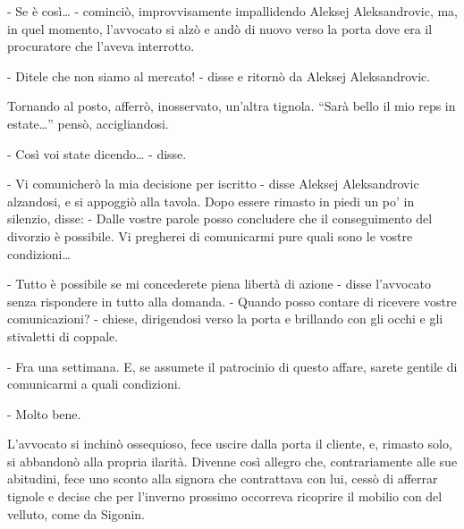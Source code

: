 - Se è così\ldots{} - cominciò, improvvisamente impallidendo Aleksej Aleksandrovic, ma, in quel momento, l'avvocato si alzò e andò di nuovo verso la porta dove era il procuratore che l'aveva interrotto. 

- Ditele che non siamo al mercato! - disse e ritornò da Aleksej Aleksandrovic. 

Tornando al posto, afferrò, inosservato, un'altra tignola. ``Sarà bello il mio reps in estate\ldots{}'' pensò, accigliandosi. 

- Così voi state dicendo\ldots{} - disse. 

- Vi comunicherò la mia decisione per iscritto - disse Aleksej Aleksandrovic alzandosi, e si appoggiò alla tavola. Dopo essere rimasto in piedi un po' in silenzio, disse: - Dalle vostre parole posso concludere che il conseguimento del divorzio è possibile. Vi pregherei di comunicarmi pure quali sono le vostre condizioni\ldots{} 

- Tutto è possibile se mi concederete piena libertà di azione - disse l'avvocato senza rispondere in tutto alla domanda. - Quando posso contare di ricevere vostre comunicazioni? - chiese, dirigendosi verso la porta e brillando con gli occhi e gli stivaletti di coppale. 

- Fra una settimana. E, se assumete il patrocinio di questo affare, sarete gentile di comunicarmi a quali condizioni. 

- Molto bene. 

L'avvocato si inchinò ossequioso, fece uscire dalla porta il cliente, e, rimasto solo, si abbandonò alla propria ilarità. Divenne così allegro che, contrariamente alle sue abitudini, fece uno sconto alla signora che contrattava con lui, cessò di afferrar tignole e decise che per l'inverno prossimo occorreva ricoprire il mobilio con del velluto, come da Sigonin. 

